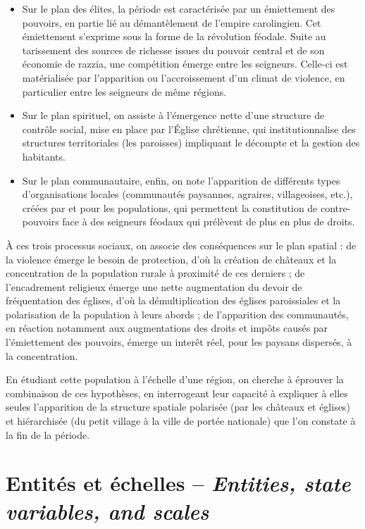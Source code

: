\begin{itemize}
	\item Sur le plan des élites, la période est caractérisée par un émiettement des pouvoirs, en partie lié au démantèlement de l'empire carolingien.
	Cet émiettement s'exprime sous la forme de la \og révolution féodale\fg{}.
	Suite au tarissement des sources de richesse issues du pouvoir central et de son économie de razzia, une compétition émerge entre les seigneurs.
	Celle-ci est matérialisée par l'apparition ou l'accroissement d'un climat de violence, en particulier entre les seigneurs de même régions.
	\item Sur le plan spirituel, on assiste à l'émergence nette d'une structure de contrôle social, mise en place par l'Église chrétienne, qui institutionnalise des structures territoriales (les paroisses) impliquant le décompte et la gestion des habitants.
	\item Sur le plan communautaire, enfin, on note l'apparition de différents types d'organisations locales (communautés paysannes, agraires, villageoises, etc.), créées par et pour les populations, qui permettent la constitution de contre-pouvoirs face à des seigneurs féodaux qui prélèvent de plus en plus de droits.
\end{itemize}

À ces trois processus sociaux, on associe des conséquences sur le plan spatial : de la violence émerge le besoin de protection, d'où la création de châteaux et la concentration de la population rurale à proximité de ces derniers ; de l'encadrement religieux émerge une nette augmentation du devoir de fréquentation des églises, d'où la démultiplication des églises paroissiales et la polarisation de la population à leurs abords ; de l'apparition des communautés, en réaction notamment aux augmentations des droits et impôts causés par l'émiettement des pouvoirs, émerge un interêt réel, pour les paysans dispersés, à la concentration.

En étudiant cette population à l'échelle d'une région, on cherche à éprouver la combinaison de ces hypothèses, en interrogeant leur capacité à expliquer à elles seules l'apparition de la structure spatiale polarisée (par les châteaux et églises) et hiérarchisée (du petit village à la ville de portée nationale) que l'on constate à la fin de la période.

\let\orisectionmark\sectionmark
\renewcommand\sectionmark[1]{}%
\section[Entités et échelles -- \textit{Entities, state variables, and scales}]{Entités et échelles -- \large{\textit{Entities, state variables, and scales}}}
\orisectionmark{Entités et échelles}
\let\sectionmark\orisectionmark

